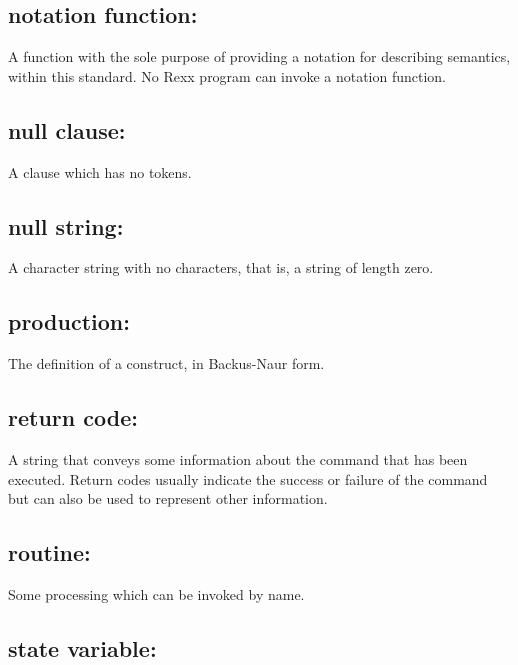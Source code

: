 \hypertarget{notation-function}{%
\subsection{notation function:}\label{notation-function}}

A function with the sole purpose of providing a notation for describing
semantics, within this standard. No Rexx program can invoke a notation
function.

\hypertarget{null-clause}{%
\subsection{null clause:}\label{null-clause}}

A clause which has no tokens.

\hypertarget{null-string}{%
\subsection{null string:}\label{null-string}}

A character string with no characters, that is, a string of length zero.

\hypertarget{production}{%
\subsection{production:}\label{production}}

The definition of a construct, in Backus-Naur form.

\hypertarget{return-code}{%
\subsection{return code:}\label{return-code}}

A string that conveys some information about the command that has been
executed. Return codes usually indicate the success or failure of the
command but can also be used to represent other information.

\hypertarget{routine}{%
\subsection{routine:}\label{routine}}

Some processing which can be invoked by name.

\hypertarget{state-variable}{%
\subsection{state variable:}\label{state-variable}}

